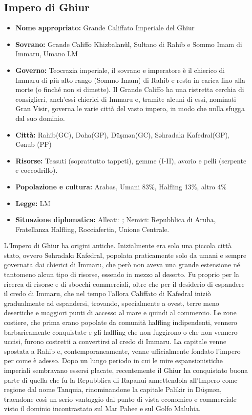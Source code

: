 \documentclass[10pt, a4paper]{report}
\begin{document}
\begin{multicols}{2}
\subsection*{Impero di Ghiur}
\begin{itemize}
	\item \textbf{Nome appropriato:} Grande Califfato Imperiale del Ghiur
	\item \textbf{Sovrano:} Grande Califfo Khizbalanûl, Sultano di Rahib e Sommo Imam di Immaru, Umano LM
	\item \textbf{Governo:} Teocrazia imperiale, il sovrano e imperatore è il chierico di Immaru di più alto rango (Sommo Imam) di Rahib e resta in carica fino alla morte (o finché non si dimette). Il Grande Califfo ha una ristretta cerchia di consiglieri, anch’essi chierici di Immaru e, tramite alcuni di essi, nominati Gran Visir, governa le varie città del vasto impero, in modo che nulla sfugga dal suo dominio.
	\item \textbf{Città:} Rahib(GC), Doha(GP), Düşmən(GC), Səhradakı Kafedral(GP), Cənub (PP)
	\item \textbf{Risorse:} Tessuti (soprattutto tappeti), gemme (I-II), avorio e pelli (serpente e coccodrillo).
	\item \textbf{Popolazione e cultura:} Arabas, Umani 83\%, Halfling 13\%, altro 4\%
	\item \textbf{Legge:} LM
	\item \textbf{Situazione diplomatica:} Alleati: ; Nemici: Repubblica di Aruba, Fratellanza Halfling, Rocciafertia, Unione Centrale.
\end{itemize}
L’Impero di Ghiur ha origini antiche. Inizialmente era solo una piccola città stato, ovvero Səhradakı Kafedral, popolata praticamente solo da umani e sempre governata dai chierici di Immaru, che però non aveva una grande estensione né tantomeno alcun tipo di risorse, essendo in mezzo al deserto. Fu proprio per la ricerca di risorse e di sbocchi commerciali, oltre che per il desiderio di espandere il credo di Immaru, che nel tempo l’allora Califfato di Kafedral iniziò gradualmente ad espandersi, trovando, specialmente a ovest, terre meno desertiche e maggiori punti di accesso al mare e quindi al commercio. Le zone costiere, che prima erano popolate da comunità halfling indipendenti, vennero barbaricamente conquistate e gli halfling che non fuggirono o che non vennero uccisi, furono costretti a convertirsi al credo di Immaru. La capitale venne spostata a Rahib e, contemporaneamente, venne ufficialmente fondato l’impero per come è adesso. Dopo un lungo periodo in cui le mire espansionistiche imperiali sembravano essersi placate, recentemente il Ghiur ha conquistato buona parte di quella che fu la Repubblica di Rapanui annettendola all’Impero come regione dal nome Tanquia, rinominandone la capitale Palikir in Düşmən, traendone così un serio vantaggio dal punto di vista economico e commerciale visto il dominio incontrastato sul Mar Pahee e sul Golfo Maluhia.


\end{multicols}
\end{document}
